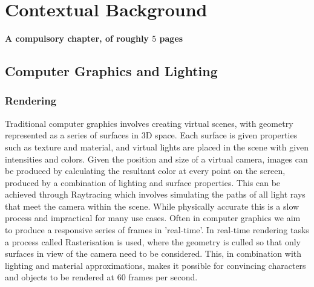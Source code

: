 \documentclass[ %
                    author={Gavin Parker},
                supervisor={Dr. Neill Campbell},
                    degree={MEng},
                     title={Deep Siamese Networks for Illumination Estimation from Stereo Images},
                  subtitle={},
                      type={research},
                      year={2018} ]{dissertation}
\begin{document}

\noindent


%

\mainmatter


\chapter{Contextual Background}
\label{chap:context}

{\bf A compulsory chapter,     of roughly $5$ pages}
\vspace{1cm} 
\section{Computer Graphics and Lighting}

\subsection{Rendering}
Traditional computer graphics involves creating virtual scenes, with geometry represented as a series of surfaces in 3D space. Each surface is given properties such as texture and material, and virtual lights are placed in the scene with given intensities and colors. Given the position and size of a virtual camera, images can be produced by calculating the resultant color at every point on the screen, produced by a combination of lighting and surface properties. This can be achieved through Raytracing which involves simulating the paths of all light rays that meet the camera within the scene. While physically accurate this is a slow process and impractical for many use cases. Often in computer graphics we aim to produce a responsive series of frames in 'real-time'. In real-time rendering tasks a process called Rasterisation is used, where the geometry is culled so that only surfaces in view of the camera need to be considered. This, in combination with lighting and material approximations, makes it possible for convincing characters and objects to be rendered at 60 frames per second.
\end{document}
